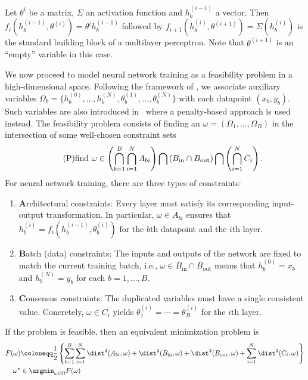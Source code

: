 \begin{example}
    Let $\theta^i$ be a matrix, $\Sigma$ an activation function and $h_b^{(i-1)}$ a vector. Then $f_i(h^{(i-1)}_b, \theta^{(i)}) = \theta^i h^{(i-1)}_b$ followed by $f_{i+1}(h^{(i)}_b, \theta^{(i+1)}) = \Sigma(h^{(i)}_b)$ is the standard building block of a multilayer perceptron. Note that $\theta^{(i+1)}$ is an ``empty'' variable in this case.
\end{example}
We now proceed to model neural network training as a feasibility problem in a high-dimensional space. Following the framework of \cite{elser2019learning, bergmeister2025projection}, we associate auxiliary variables $\Omega_b =\{h^{(0)}_b, \ldots, h^{(N)}_b, \theta^{(1)}_b, \ldots, \theta_b^{(N)}\}$ with each datapoint $(x_b, y_b)$. Such variables are also introduced in~\cite{carreira2014distributed} where a penalty-based approach is used instead. The feasibility problem consists of finding an $\omega = (\Omega_1, \ldots, \Omega_B)$ in the intersection of some well-chosen constraint sets
\begin{equation} \label{eq:feasibility} \tag{P}
    \textnormal{find } \omega \in \left(\bigcap_{b=1}^B\bigcap_{i=1}^N A_{bi}\right) \bigcap \left(B_{\mathrm{in}} \cap B_{\mathrm{out}}\right) \bigcap \left(\bigcap_{i=1}^N C_i\right).
\end{equation}
For neural network training, there are three types of constraints:

\begin{enumerate}
    \item \textbf{A}rchitectural constraints: Every layer must satisfy its corresponding input-output transformation. In particular, $\omega \in A_{bi}$ ensures that $h_b^{(i)} = f_i(h_b^{(i-1)}, \theta_b^{(i)})$ for the $b$th datapoint and the $i$th layer.
    \item \textbf{B}atch (data) constraints: The inputs and outputs of the network are fixed to match the current training batch, i.e., $\omega \in B_{\mathrm{in}} \cap B_{\mathrm{out}}$ means that $h_b^{(0)} = x_b$ and $h_b^{(N)} = y_b$ for each $b=1,\ldots,B$.
    \item \textbf{C}onsensus constraints: The duplicated variables must have a single consistent value. Concretely, $\omega \in C_i$ yields $\theta_1^{(i)} = \cdots = \theta_B^{(i)}$ for the $i$th layer. 
\end{enumerate}


If the problem is feasible, then an equivalent minimization problem is
\begin{align*}
    F(\omega) &\coloneqq \frac{1}{2}\left\{\sum_{b=1}^B \sum_{i=1}^N \dist^2(A_{bi}, \omega)   + \dist^2(B_{\mathrm{in}}, \omega) + \dist^2(B_{\mathrm{out}}, \omega) + \sum_{i=1}^N \dist^2(C_i, \omega)\right\} \\
    \omega^\star &\in \argmin_{\omega\in\Omega} F(\omega)
\end{align*}

